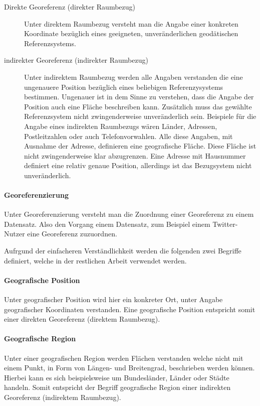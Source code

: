 			\begin{description}
	 			\item[Direkte Georeferenz (direkter Raumbezug)] 
	 			Unter direktem Raumbezug versteht man die Angabe einer konkreten Koordinate bezüglich eines geeigneten, unveränderlichen geodätischen Referenzsystems. 
	 			\item[indirekter Georeferenz (indirekter Raumbezug) ] 
	 			Unter indirektem Raumbezug werden alle Angaben verstanden die eine ungenauere Position bezüglich eines beliebigen Referenzysystems bestimmen.
	 			Ungenauer ist in dem Sinne zu verstehen, dass die Angabe der Position auch eine Fläche beschreiben kann.
	 			Zusätzlich muss das gewählte Referenzsystem nicht zwingenderweise unveränderlich sein.   
	 			Beispiele für die Angabe eines indirekten Raumbezugs wären Länder, Adressen, Postleitzahlen oder auch Telefonvorwahlen. 
	 			Alle diese Angaben, mit Ausnahme der Adresse, definieren eine geografische Fläche. 
	 			Diese Fläche ist nicht zwingenderweise klar abzugrenzen.
	 			Eine Adresse mit Hausnummer definiert eine relativ genaue Position, allerdings ist das Bezugsystem nicht unveränderlich.
			\end{description}

	 	\paragraph*{Georeferenzierung}
		Unter Georeferenzierung versteht man die Zuordnung einer Georeferenz zu einem Datensatz. 
		Also den Vorgang einem Datensatz, zum Beispiel einem Twitter-Nutzer eine Georeferenz zuzuordnen.

	 	Aufrgund der einfacheren Verständlichkeit werden die folgenden zwei Begriffe definiert, welche in der restlichen Arbeit verwendet werden.

		\paragraph*{Geografische Position}
		Unter geografischer Position wird hier ein konkreter Ort, unter Angabe geografischer Koordinaten verstanden.
		Eine geografische Position entspricht somit einer direkten Georeferenz (direktem Raumbezug).

		\paragraph*{Geografische Region} 
		Unter einer geografischen Region werden Flächen verstanden welche nicht mit einem Punkt, in Form von Längen- und Breitengrad, beschrieben werden können. 
		Hierbei kann es sich beispielsweise um Bundesländer, Länder oder Städte handeln.
		Somit entspricht der Begriff geografische Region einer indirekten Georeferenz (indirektem Raumbezug).

